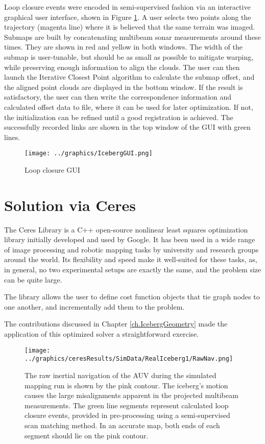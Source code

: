 Loop closure events were encoded in semi-supervised fashion via an interactive graphical user interface, shown in Figure \ref{fig:GUI}. A user selects two points along the trajectory (magenta line) where it is believed that the same terrain was imaged. Submaps are built by concatenating multibeam sonar measurements around these times. They are shown in red and yellow in both windows. The width of the submap is user-tunable, but should be as small as possible to mitigate warping, while preserving enough information to align the clouds. The user can then launch the Iterative Closest Point algorithm to calculate the submap offset, and the aligned point clouds are displayed in the bottom window. If the result is satisfactory, the user can then write the correspondence information and calculated offset data to file, where it can be used for later optimization. If not, the initialization can be refined until a good registration is achieved. The successfully recorded links are shown in the top window of the GUI with green lines. 


 \begin{figure}[htbp]
   \centering
   \texttt{[image: ../graphics/IcebergGUI.png]} %
   \caption{Loop closure GUI}
   \label{fig:GUI}
\end{figure}

\section{Solution via Ceres}

The Ceres Library is a C++ open-source nonlinear least squares optimization library initially developed and used by Google. It has been used in a wide range of image processing and robotic mapping tasks by university and research groups around the world. Its flexibility and speed make it well-suited for these tasks, as, in general, no two experimental setups are exactly the same, and the problem size can be quite large.  

The library allows the user to define cost function objects that tie graph nodes to one another, and incrementally add them to the problem. 

The contributions discussed in Chapter \ref{ch.IcebergGeometry} made the application of this optimized solver a straightforward exercise. 

 \begin{figure}[htbp]
   \centering
   \texttt{[image: ../graphics/ceresResults/SimData/RealIceberg1/RawNav.png]} %
   \caption{The raw inertial navigation of the AUV during the simulated mapping run is shown by the pink contour. The iceberg's motion causes the large misalignments apparent in the projected multibeam measurements. The green line segments represent calculated loop closure events, provided in pre-processing using a semi-supervised scan matching method. In an accurate map, both ends of each segment should lie on the pink contour.}
   \label{fig:RawNav}
\end{figure}

